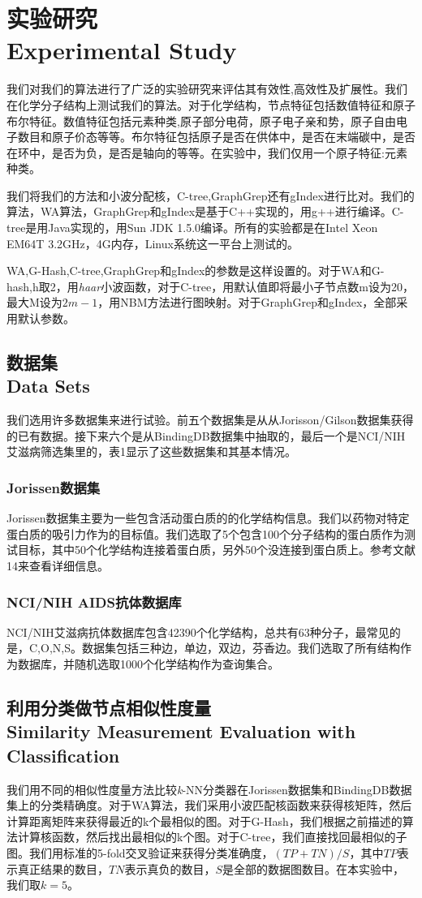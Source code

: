 \documentclass{article}
\begin{document}
\else

\fi
\chapter{实验研究 \\ Experimental Study}
我们对我们的算法进行了广泛的实验研究来评估其有效性,高效性及扩展性。我们在化学分子结构上测试我们的算法。对于化学结构，节点特征包括数值特征和原子布尔特征。数值特征包括元素种类,原子部分电荷，原子电子亲和势，原子自由电子数目和原子价态等等。布尔特征包括原子是否在供体中，是否在末端碳中，是否在环中，是否为负，是否是轴向的等等。在实验中，我们仅用一个原子特征:元素种类。

我们将我们的方法和小波分配核，C-tree,GraphGrep还有gIndex进行比对。我们的算法，WA算法，GraphGrep和gIndex是基于C++实现的，用g++进行编译。C-tree是用Java实现的，用Sun JDK 1.5.0编译。所有的实验都是在Intel Xeon EM64T 3.2GHz，4G内存，Linux系统这一平台上测试的。

WA,G-Hash,C-tree,GraphGrep和gIndex的参数是这样设置的。对于WA和G-hash,h取2，用\emph{haar}小波函数，对于C-tree，用默认值即将最小子节点数m设为20，最大M设为$2m-1$，用NBM方法进行图映射。对于GraphGrep和gIndex，全部采用默认参数。

\section{数据集 \\ Data Sets}
我们选用许多数据集来进行试验。前五个数据集是从从Jorisson/Gilson数据集获得的已有数据。接下来六个是从BindingDB数据集中抽取的，最后一个是NCI/NIH 艾滋病筛选集里的，表1显示了这些数据集和其基本情况。
\subsection{Jorissen数据集}
Jorissen数据集主要为一些包含活动蛋白质的的化学结构信息。我们以药物对特定蛋白质的吸引力作为的目标值。我们选取了5个包含100个分子结构的蛋白质作为测试目标，其中50个化学结构连接着蛋白质，另外50个没连接到蛋白质上。参考文献14来查看详细信息。

\subsection{NCI/NIH AIDS抗体数据库}
NCI/NIH艾滋病抗体数据库包含42390个化学结构，总共有63种分子，最常见的是，C,O,N,S。数据集包括三种边，单边，双边，芬香边。我们选取了所有结构作为数据库，并随机选取1000个化学结构作为查询集合。
\section{利用分类做节点相似性度量 \\ Similarity Measurement Evaluation with Classification}
我们用不同的相似性度量方法比较\emph{k}-NN分类器在Jorissen数据集和BindingDB数据集上的分类精确度。对于WA算法，我们采用小波匹配核函数来获得核矩阵，然后计算距离矩阵来获得最近的k个最相似的图。对于G-Hash，我们根据之前描述的算法计算核函数，然后找出最相似的k个图。对于C-tree，我们直接找回最相似的子图。我们用标准的5-fold交叉验证来获得分类准确度，$(TP+TN)/S$，其中$TP$表示真正结果的数目，$TN$表示真负的数目，$S$是全部的数据图数目。在本实验中，我们取$k=5$。
\end{document}
